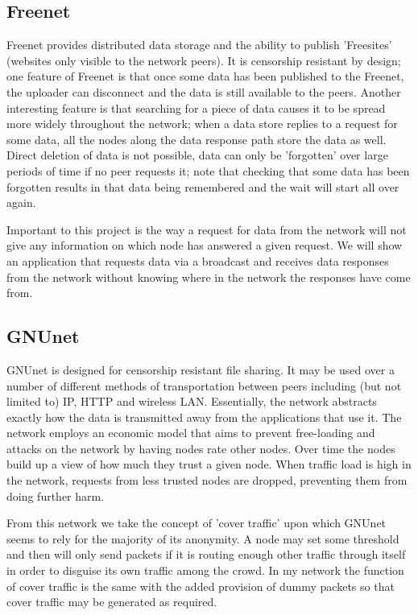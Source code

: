 \documentclass[ %
                    author={Luke Murray},
                supervisor={Dr. Simon Hollis},
                     title={Shadow Peer-to-Peer Networks},
                  subtitle={},
                    degree={MEng},
                      year={2013} ]{thesis}
\begin{document}
\subsection{Freenet}

Freenet\cite{Freenet} provides distributed data storage and the ability to publish 'Freesites' (websites only visible to the network peers). It is censorship resistant by design; one feature of Freenet is that once some data has been published to the Freenet, the uploader can disconnect and the data is still available to the peers. Another interesting feature is that searching for a piece of data causes it to be spread more widely throughout the network; when a data store replies to a request for some data, all the nodes along the data response path store the data as well. Direct deletion of data is not possible, data can only be 'forgotten' over large periods of time if no peer requests it; note that checking that some data has been forgotten results in that data being remembered and the wait will start all over again.

Important to this project is the way a request for data from the network will not give any information on which node has answered a given request. We will show an application that requests data via a broadcast and receives data responses from the network without knowing where in the network the responses have come from. 

\subsection{GNUnet}

GNUnet\cite{GNUnet} is designed for censorship resistant file sharing. It may be used over a number of different methods of transportation between peers including (but not limited to) IP, HTTP and wireless LAN. Essentially, the network abstracts exactly how the data is transmitted away from the applications that use it. The network employs an economic model that aims to prevent free-loading and attacks on the network by having nodes rate other nodes. Over time the nodes build up a view of how much they trust a given node. When traffic load is high in the network, requests from less trusted nodes are dropped, preventing them from doing further harm.

From this network we take the concept of 'cover traffic' upon which GNUnet seems to rely for the majority of its anonymity. A node may set some threshold and then will only send packets if it is routing enough other traffic through itself in order to disguise its own traffic among the crowd. In my network the function of cover traffic is the same with the added provision of dummy packets so that cover traffic may be generated as required.
\end{document}
